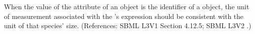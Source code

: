 When the value of the attribute  of an \EventAssignment
object is the identifier of a \Species object, the unit of measurement
associated with the \EventAssignment's  expression should be
consistent with the unit of that species' size.  (References: SBML L3V1 Section 4.12.5; SBML L3V2
.)
